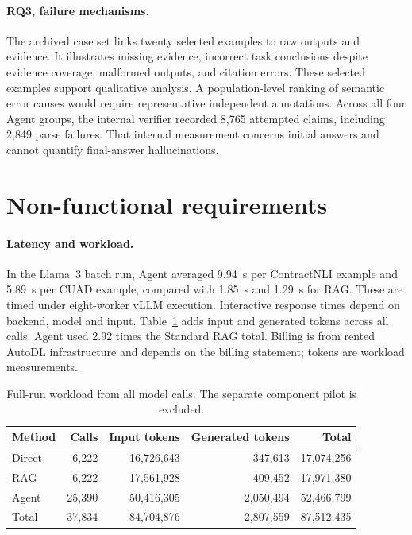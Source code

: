 \documentclass{article}
\begin{document}
\paragraph{RQ3, failure mechanisms.} The archived case set links twenty selected examples to raw outputs and evidence. It illustrates missing evidence, incorrect task conclusions despite evidence coverage, malformed outputs, and citation errors. These selected examples support qualitative analysis. A population-level ranking of semantic error causes would require representative independent annotations. Across all four Agent groups, the internal verifier recorded 8,765 attempted claims, including 2,849 parse failures. That internal measurement concerns initial answers and cannot quantify final-answer hallucinations.

\section{Non-functional requirements}
\paragraph{Latency and workload.} In the Llama~3 batch run, Agent averaged 9.94~s per ContractNLI example and 5.89~s per CUAD example, compared with 1.85~s and 1.29~s for RAG. These are timed under eight-worker vLLM execution. Interactive response times depend on backend, model and input. Table~\ref{tab:tokens} adds input and generated tokens across all calls. Agent used 2.92 times the Standard RAG total. Billing is from rented AutoDL infrastructure and depends on the billing statement; tokens are workload measurements.

\begin{table}[!htbp]
\centering\small
\begin{tabular}{lrrrr}
\toprule
Method & Calls & Input tokens & Generated tokens & Total \\
\midrule
Direct & 6,222 & 16,726,643 & 347,613 & 17,074,256 \\
RAG & 6,222 & 17,561,928 & 409,452 & 17,971,380 \\
Agent & 25,390 & 50,416,305 & 2,050,494 & 52,466,799 \\
\midrule
Total & 37,834 & 84,704,876 & 2,807,559 & 87,512,435 \\
\bottomrule
\end{tabular}
\caption{Full-run workload from all model calls. The separate component pilot is excluded.}
\label{tab:tokens}
\end{table}
\end{document}
